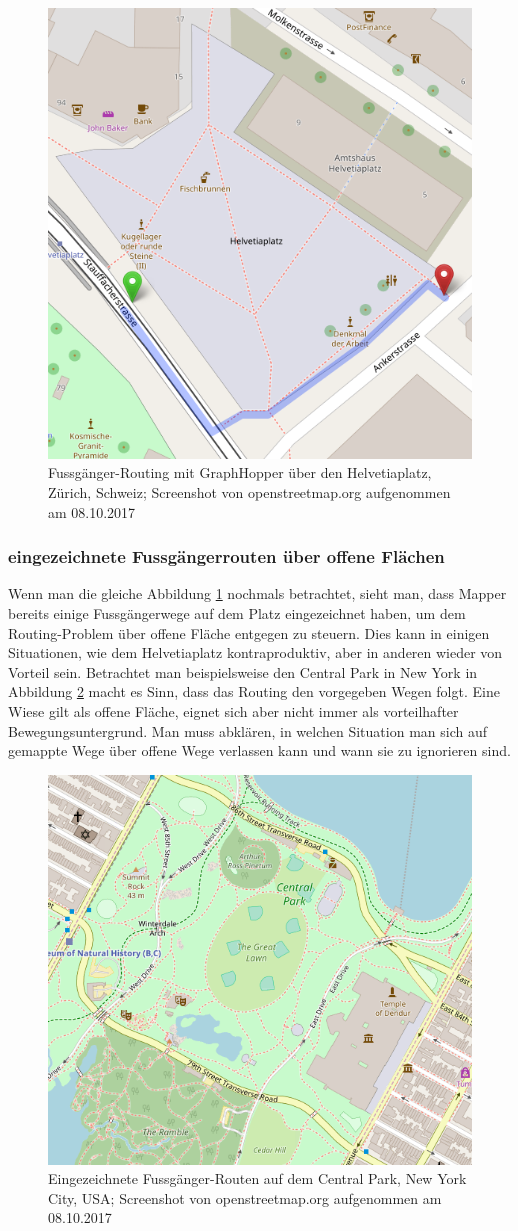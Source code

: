 \begin{figure}[ht]
	\centering
	\includegraphics[width=0.5\linewidth]{technicalreport/img/helvetiaplatz_graphhopper}
	\caption[Fussgänger-Routing]{Fussgänger-Routing mit GraphHopper über den Helvetiaplatz, Zürich, Schweiz; Screenshot von openstreetmap.org aufgenommen am 08.10.2017}
	\label{fig:helvetiaplatz_graphhopper}
\end{figure}

\subsubsection{eingezeichnete Fussgängerrouten über offene Flächen}
\label{subsub:eingezeichnete Fussgängerrouten über offene Flächen}
Wenn man die gleiche Abbildung \ref{fig:helvetiaplatz_graphhopper} nochmals betrachtet, sieht man, dass Mapper bereits einige Fussgängerwege auf dem Platz eingezeichnet haben, um dem Routing-Problem über offene Fläche entgegen zu steuern. Dies kann in einigen Situationen, wie dem Helvetiaplatz kontraproduktiv, aber in anderen wieder von Vorteil sein. Betrachtet man beispielsweise den Central Park in New York in Abbildung \ref{fig:central_park} macht es Sinn, dass das Routing den vorgegeben Wegen folgt. Eine Wiese gilt als offene Fläche, eignet sich aber nicht immer als vorteilhafter Bewegungsuntergrund. Man muss abklären, in welchen Situation man sich auf gemappte Wege über offene Wege verlassen kann und wann sie zu ignorieren sind.

\begin{figure}[ht]
\centering
\includegraphics[width=0.5\linewidth]{technicalreport/img/central_park}
\caption[eingezeichnete Fussgänger-Routen]{Eingezeichnete Fussgänger-Routen auf dem Central Park, New York City, USA; Screenshot von openstreetmap.org aufgenommen am 08.10.2017}
\label{fig:central_park}
\end{figure}


